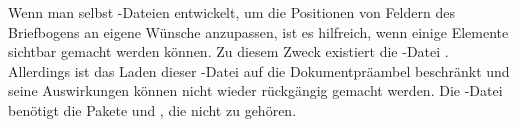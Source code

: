 \begin{Declaration}
\end{Declaration}
%
Wenn man selbst -Dateien entwickelt, %
%
um die Positionen von %
%
Feldern des Briefbogens an eigene Wünsche %
%
anzupassen, ist es hilfreich, wenn %
%
einige Elemente %
%
sichtbar gemacht werden können. Zu diesem Zweck existiert die -Datei
%
%
. Allerdings ist das Laden dieser %
\iffalse \emph{Letter Class Option} \else {}-Datei
\fi%
auf die Dokumentpräambel beschränkt und seine Auswirkungen können nicht wieder
rückgängig gemacht werden. Die -Datei %
\iffalse bedient sich der \else benötigt die \fi %
Pakete %
 und
, die nicht zu \KOMAScript{} gehören.

